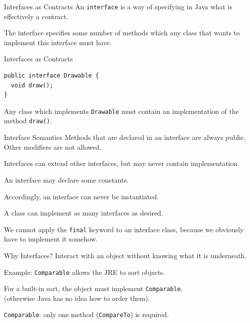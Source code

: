 \documentclass{beamer}
\begin{document}
\begin{frame}{Interfaces as Contracts}
An \texttt{interface} is a way of specifying in Java what is effectively a contract. 

The interface specifies some number of methods which any class that wants to implement this interface must have.
\end{frame}


\begin{frame}[fragile]{Interfaces as Contracts}
\begin{verbatim}
public interface Drawable {
  void draw();
}
\end{verbatim}

Any class which implements \texttt{Drawable} must contain an implementation of the method \texttt{draw()}.
\end{frame}




\begin{frame}{Interface Semantics}
Methods that are declared in an interface are always public.\\
\quad Other modifiers are not allowed.

Interfaces can extend other interfaces, but may never contain implementation. 

An interface may declare some constants.

Accordingly, an interface can never be instantiated. 

A class can implement as many interfaces as desired.

We cannot apply the \texttt{final} keyword to an interface class, because we obviously have to implement it somehow.
\end{frame}





\begin{frame}{Why Interfaces?}
Interact with an object without knowing what it is underneath. 

Example: \texttt{Comparable} allows the JRE to sort objects.

For a built-in sort, the object must implement \texttt{Comparable}.\\\quad (otherwise Java has no idea how to order them). 

\texttt{Comparable}: only one method (\texttt{CompareTo}) is required.
\end{frame}
\end{document}
